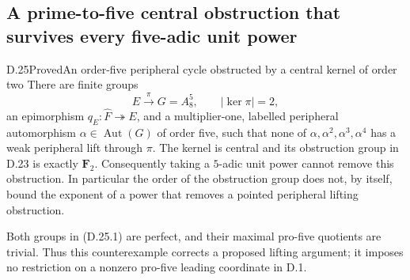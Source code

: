 \subsection{A prime-to-five central obstruction that survives every five-adic unit power}

\begin{statement}{D.25}{Proved}{An order-five peripheral cycle obstructed by a central kernel of order two}
There are finite groups
\[
 E\xrightarrow{\pi}G=A_8^5,\qquad |\ker\pi|=2,
 \tag{D.25.1}
\]
an epimorphism $q_E:\widehat F\twoheadrightarrow E$, and a
multiplier-one, labelled peripheral automorphism
$\alpha\in\operatorname{Aut}(G)$ of order five, such that
none of $\alpha,\alpha^2,\alpha^3,\alpha^4$ has a weak
peripheral lift through $\pi$.  The kernel is central and its
obstruction group in D.23 is exactly $\mathbf F_2$.
Consequently taking a $5$-adic unit power cannot remove this
obstruction.  In particular the order of the obstruction group
does not, by itself, bound the exponent of a power that removes
a pointed peripheral lifting obstruction.

Both groups in \textup{(D.25.1)} are perfect, and their maximal
pro-five quotients are trivial.  Thus this counterexample
corrects a proposed lifting argument; it imposes no restriction
on a nonzero pro-five leading coordinate in D.1.
\end{statement}

